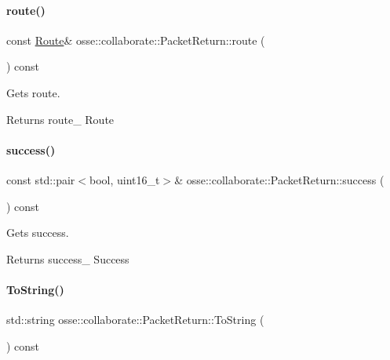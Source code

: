 \paragraph{\texorpdfstring{route()}{route()}}
{\footnotesize\ttfamily const \hyperlink{classosse_1_1collaborate_1_1_packet_return_a1c00d25b9e8d526be915c28b8ee0ba3b}{Route}\& osse\+::collaborate\+::\+Packet\+Return\+::route (\begin{DoxyParamCaption}{ }\end{DoxyParamCaption}) const\hspace{0.3cm}{\ttfamily [inline]}}



Gets route. 

\begin{DoxyReturn}{Returns}
route\+\_\+ Route 
\end{DoxyReturn}
\mbox{\label{classosse_1_1collaborate_1_1_packet_return_ac6b2ab10694bac5f89cf829e34742345}} 
\paragraph{\texorpdfstring{success()}{success()}}
{\footnotesize\ttfamily const std\+::pair$<$bool, uint16\+\_\+t$>$\& osse\+::collaborate\+::\+Packet\+Return\+::success (\begin{DoxyParamCaption}{ }\end{DoxyParamCaption}) const\hspace{0.3cm}{\ttfamily [inline]}}



Gets success. 

\begin{DoxyReturn}{Returns}
success\+\_\+ Success 
\end{DoxyReturn}
\mbox{\label{classosse_1_1collaborate_1_1_packet_return_a415e0fd114b2460f62a6800023dafc0a}} 
\paragraph{\texorpdfstring{To\+String()}{ToString()}}
{\footnotesize\ttfamily std\+::string osse\+::collaborate\+::\+Packet\+Return\+::\+To\+String (\begin{DoxyParamCaption}{ }\end{DoxyParamCaption}) const}



